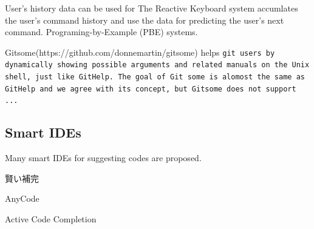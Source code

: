 \documentclass{sigchi}
\def\GH{\textsf{GitHelp}}
\begin{document}
User's history data can be used for 
The Reactive Keyboard system\cite{ReactiveKeyboard}
accumlates the user's command history and use the data
for predicting the user's next command.
Programing-by-Example (PBE) systems\cite{Cypher}\cite{Lieberman}.

Gitsome(https://github.com/donnemartin/gitsome)
helps \tt{git} users by dynamically
showing possible arguments and related manuals on the Unix shell,
just like {\GH}.
The goal of Git some is alomost the same as {\GH} and we agree with its concept,
but Gitsome does not support ...

\subsection{Smart IDEs}

Many smart IDEs for suggesting codes are proposed.

賢い補完
\cite{Little:2006:TKC:1166253.1166275}

AnyCode\cite{Gvero:2015:SJE:2814270.2814295}

Active Code Completion\cite{Omar:2012:ACC:2337223.2337324}
\end{document}
